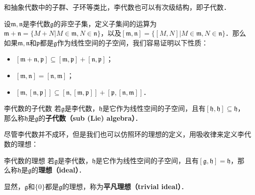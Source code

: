 



和抽象代数中的子群、子环等类比，李代数也可以有次级结构，即子代数．

设$\mathfrak{m}, \mathfrak{n}$是李代数$\mathfrak{g}$的非空子集，定义子集间的运算为$\mathfrak{m}+\mathfrak{n}=\{M+N|M\in\mathfrak{m}, N\in\mathfrak{n}\}$，以及$[\mathfrak{m}, \mathfrak{n}]=\{[M, N]|M\in\mathfrak{m}, N\in\mathfrak{n}\}$．那么如果$\mathfrak{m}, \mathfrak{n}$和$\mathfrak{p}$都是$\mathfrak{g}$作为线性空间的子空间，我们容易证明以下性质：

\begin{itemize}
\item $[\mathfrak{m}+\mathfrak{n}, \mathfrak{p}]\subseteq[\mathfrak{m}, \mathfrak{p}]+[\mathfrak{n}, \mathfrak{p}]$；
\item $[\mathfrak{m},\mathfrak{n}]=[\mathfrak{n}, \mathfrak{m}]$；
\item $[\mathfrak{m}, [\mathfrak{n}, \mathfrak{p}]]\subseteq[\mathfrak{n}, [\mathfrak{m}, \mathfrak{p}]]+[\mathfrak{p}, [\mathfrak{n}, \mathfrak{m}]]$．
\end{itemize}

\begin{definition}{李代数的子代数}
若$\mathfrak{g}$是李代数，$\mathfrak{h}$是它作为线性空间的子空间，且有$[\mathfrak{h}, \mathfrak{h}]\subseteq\mathfrak{h}$，那么称$\mathfrak{h}$是$\mathfrak{g}$的\textbf{子代数（sub (Lie) algebra）}．
\end{definition}


尽管李代数并不成环，但是我们也可以仿照环的理想的定义，用吸收律来定义李代数的理想：

\begin{definition}{李代数的理想}
若$\mathfrak{g}$是李代数，$\mathfrak{h}$是它作为线性空间的子空间，且有$[\mathfrak{g}, \mathfrak{h}]=\mathfrak{h}$，那么称$\mathfrak{h}$是$\mathfrak{g}$的\textbf{理想（ideal）}．

显然，$\mathfrak{g}$和$\{0\}$都是$\mathfrak{g}$的理想，称为\textbf{平凡理想（trivial ideal）}．
\end{definition}





